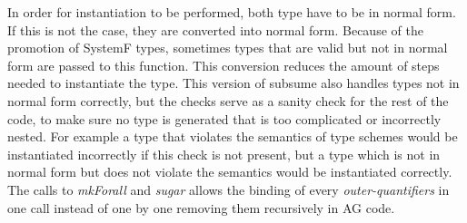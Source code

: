 \documentclass[twoside, titlepage, openright, a4paper]{book}
\begin{document}
In order for instantiation to be performed, both type have to be in normal form. If this is not the case, they are converted into normal form. Because of the promotion of SystemF types, sometimes types that are valid but not in normal form are passed to this function. This conversion reduces the amount of steps needed to instantiate the type. This version of subsume also handles types not in normal form correctly, but the checks serve as a sanity check for the rest of the code, to make sure no type is  generated that is too complicated or incorrectly nested. For example a type that violates the semantics of type schemes would be instantiated incorrectly if this check is not present, but a type which is not in normal form but does not violate the semantics would be instantiated correctly.
The calls to \emph{mkForall} and \emph{sugar} allows the binding of every \emph{outer-quantifiers} in one call instead of one by one removing them recursively in AG code.
\end{document}
